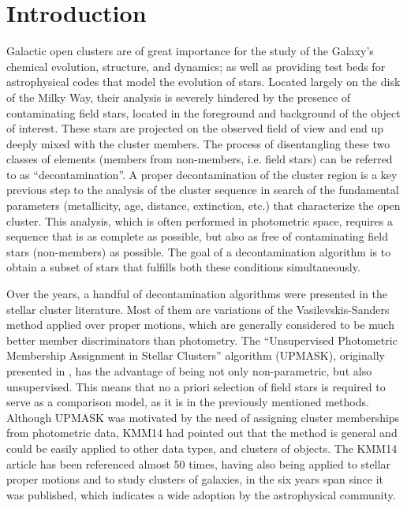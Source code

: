\documentclass{aa}
\begin{document}

\maketitle



\section{Introduction}
 \label{sec:intro}

 Galactic open clusters are of great importance for the study of the
 Galaxy's chemical evolution, structure, and dynamics; as well as providing
 test beds for astrophysical codes that model the evolution of stars.
 Located largely on the disk of the Milky Way, their analysis is severely
 hindered by the presence of contaminating field stars, located in the
 foreground and background of the object of interest. These stars are
 projected on the observed field of view and end up deeply mixed
 with the cluster members. The process of disentangling these two classes of
 elements (members from non-members, i.e. field stars) can be referred
 to as ``decontamination''.
 A proper decontamination of the cluster region is a key previous step to the
 analysis of the cluster sequence in search of the fundamental parameters 
 (metallicity, age, distance, extinction, etc.) that characterize the open
 cluster. This analysis, which is often performed in photometric
 space, requires a sequence that is as complete as possible, but also as free
 of contaminating field stars (non-members) as possible. The goal of a
 decontamination algorithm is to obtain a subset of stars that fulfills both
 these conditions simultaneously.

 Over the years, a handful of decontamination algorithms were presented in the
 stellar cluster literature. Most of them are variations of the
 Vasilevskis-Sanders method \citep{Vasilevskis_1958,Sanders_1971} applied over
 proper motions, which are generally considered to be much better member
 discriminators than photometry.
 The ``Unsupervised Photometric Membership Assignment in Stellar Clusters''
 algorithm (UPMASK), originally presented in \citet[][henceforth KMM14]{KMM14},
 has the advantage of being not only non-parametric, but also unsupervised.
 This means that no a priori selection of field stars is required to serve as a
 comparison model, as it is in the previously mentioned methods. Although
 UPMASK was motivated by the need of assigning cluster memberships from
 photometric data, KMM14 had pointed out that the method is general and could
 be easily applied to other data types, and clusters of objects.
 The KMM14 article has been referenced almost 50 times, having also being
 applied to stellar proper motions and to study clusters of galaxies, in the six
 years span since it was published, which indicates a wide adoption by the
 astrophysical community.
\end{document}

